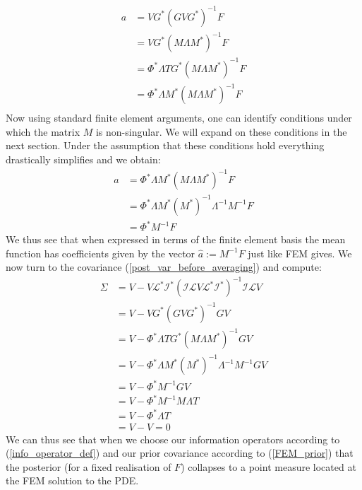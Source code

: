 \begin{align*}
    a &= VG^{*}(GVG^{*})^{-1}F \\
    &= VG^{*}(M\Lambda M^{*})^{-1}F \\
    &= \Phi^{*}\Lambda TG^{*}(M\Lambda M^{*})^{-1}F \\
    &= \Phi^{*}\Lambda M^{*}(M\Lambda M^{*})^{-1}F \\
\end{align*}
Now using standard finite element arguments, one can identify conditions under which the matrix $M$ is non-singular. We will expand on these conditions in the next section. Under the assumption that these conditions hold everything drastically simplifies and we obtain:
\begin{align*}
    a &= \Phi^{*}\Lambda M^{*}(M\Lambda M^{*})^{-1}F \\
    &= \Phi^{*}\Lambda M^{*}(M^{*})^{-1}\Lambda^{-1}M^{-1}F \\
    &= \Phi^{*}M^{-1}F
\end{align*}
We thus see that when expressed in terms of the finite element basis the mean function has coefficients given by the vector $\hat{a}:=M^{-1}F$ just like FEM gives. We now turn to the covariance (\ref{post_var_before_averaging}) and compute:
\begin{align*}
    \Sigma &= V -V\mathcal{L}^{*}\mathcal{I}^{*}(\mathcal{I}\mathcal{L}V\mathcal{L}^{*}\mathcal{I}^{*})^{-1}\mathcal{I}\mathcal{L}V \\
    &= V - VG^{*}(GVG^{*})^{-1}GV \\
    &= V - \Phi^{*}\Lambda TG^{*}(M\Lambda M^{*})^{-1}GV \\
    &= V - \Phi^{*}\Lambda M^{*}(M^{*})^{-1}\Lambda^{-1}M^{-1}GV \\
    &= V - \Phi^{*}M^{-1}GV \\
    &= V - \Phi^{*}M^{-1}M\Lambda T \\
    &= V - \Phi^{*}\Lambda T \\
    &= V - V = 0
\end{align*}
We can thus see that when we choose our information operators according to (\ref{info_operator_def}) and our prior covariance according to (\ref{FEM_prior}) that the posterior (for a fixed realisation of $F$) collapses to a point measure located at the FEM solution to the PDE. \\

